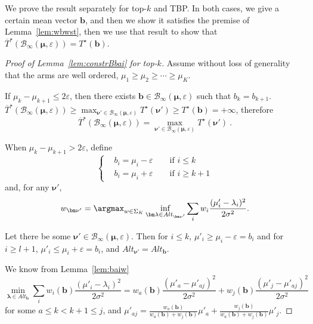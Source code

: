 \lemconstrBbai*

We prove the result separately for top-$k$ and TBP. In both cases, we give a certain mean vector $\bm b$, and then we show it satisfies the premise of Lemma~\ref{lem:wbwst}, then we use that result to show that $\overline{T}^\star(\mathcal{B}_\infty(\bm\mu,\varepsilon))=T^\star(\bm b)$.

\begin{proof}[Proof of Lemma~\ref{lem:constrBbai} for top-$k$]
	Assume without loss of generality that the arms are well ordered, $\mu_1\geq \mu_2\geq \cdots \geq \mu_K$.
	
	If $\mu_{k}-\mu_{k+1}\leq 2\varepsilon$, then there exists $\bm b\in \mathcal B_{\infty}(\bm\mu, \varepsilon)$ such that $b_k=b_{k+1}$. $\overline{T}^\star(\mathcal B_{\infty}(\bm\mu, \varepsilon))\geq \max_{\bm\nu'\in \mathcal B_{\infty}(\bm\mu, \varepsilon)} T^\star(\bm\nu')\geq T^\star(\bm b)=+\infty$, therefore \[\overline{T}^\star(\mathcal B_{\infty}(\bm\mu, \varepsilon))= \max_{\bm\nu'\in \mathcal B_{\infty}(\bm\mu, \varepsilon)} T^\star(\bm\nu')\: .\]
	
	When $\mu_k-\mu_{k+1}>2\varepsilon$, define \[\left\{ \begin{aligned} &b_i= \mu_i-\varepsilon \qquad\text{if }i\leq k \\ &b_i =\mu_i +\varepsilon \qquad\text{if }i\geq k+1\end{aligned}\right. \]
	and, for any $\bm\nu'$, \[w_{\bm\nu'} =\argmax_{w\in \Sigma_K} \inf_{\bm\lambda\in Alt_{\bm\nu'}} \sum_i w_i \frac{(\mu_i'-\lambda_i)^2}{2\sigma^2}.\] 
	
	
	Let there be some $\bm{\nu}'\in \mathcal B_{\infty}(\bm\mu, \varepsilon)$. Then for $i\leq k$, $\mu'_{i} \geq \mu_i-\varepsilon=b_{i}$ and for $i\geq l+1$, $\mu'_i \leq \mu_i +\varepsilon = b_i$, and $Alt_{\bm\nu'}=Alt_{\bm b}$.
	
	We know from Lemma~\ref{lem:baiw} \begin{equation}\label{eq:argmin} \min_{\bm{\lambda}\in Alt_{\bm b}}\sum_i  w_i(\bm{b})\frac{(\mu'_i-\lambda_i)^2}{2\sigma^2} = w_a(\bm b)\frac{(\mu'_a-\mu'_{aj})^2}{2\sigma^2}+w_j(\bm b)\frac{(\mu'_j-\mu'_{aj})^2}{2\sigma^2}\end{equation} for some $a\leq k<k+1\leq j$, and $\mu'_{aj}= \frac{w_a(\bm{b})}{w_a(\bm{b})+w_j(\bm{b})}\mu'_a + \frac{w_j(\bm{b})}{w_a(\bm{b})+w_j(\bm{b})}\mu'_j$. 
	


\end{proof}
